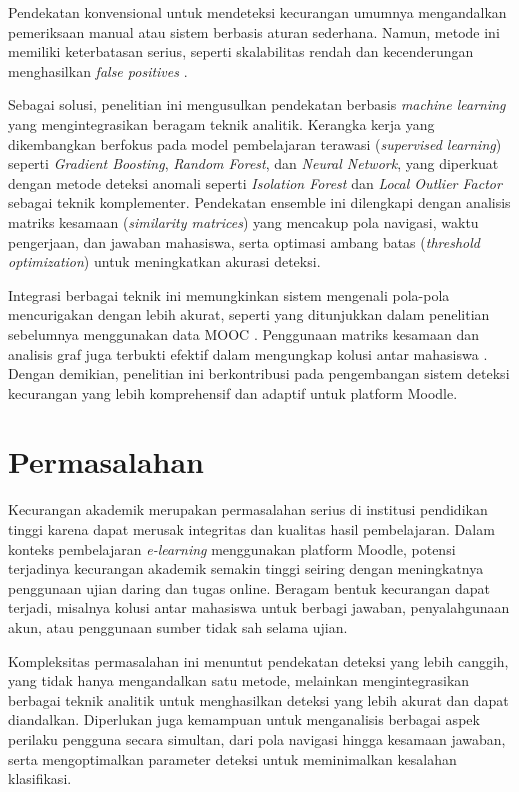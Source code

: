 Pendekatan konvensional untuk mendeteksi kecurangan umumnya mengandalkan pemeriksaan manual atau sistem berbasis aturan sederhana. Namun, metode ini memiliki keterbatasan serius, seperti skalabilitas rendah dan kecenderungan menghasilkan \textit{false positives} \cite{MorenoMarcos2023}. 

Sebagai solusi, penelitian ini mengusulkan pendekatan berbasis \textit{machine learning} yang mengintegrasikan beragam teknik analitik. Kerangka kerja yang dikembangkan berfokus pada model pembelajaran terawasi (\textit{supervised learning}) seperti \textit{Gradient Boosting}, \textit{Random Forest}, dan \textit{Neural Network}, yang diperkuat dengan metode deteksi anomali seperti \textit{Isolation Forest} dan \textit{Local Outlier Factor} sebagai teknik komplementer. Pendekatan ensemble ini dilengkapi dengan analisis matriks kesamaan (\textit{similarity matrices}) yang mencakup pola navigasi, waktu pengerjaan, dan jawaban mahasiswa, serta optimasi ambang batas (\textit{threshold optimization}) untuk meningkatkan akurasi deteksi.

Integrasi berbagai teknik ini memungkinkan sistem mengenali pola-pola mencurigakan dengan lebih akurat, seperti yang ditunjukkan dalam penelitian sebelumnya menggunakan data MOOC \cite{Alexandron2019}. Penggunaan matriks kesamaan dan analisis graf juga terbukti efektif dalam mengungkap kolusi antar mahasiswa \cite{Chang2023}. Dengan demikian, penelitian ini berkontribusi pada pengembangan sistem deteksi kecurangan yang lebih komprehensif dan adaptif untuk platform Moodle.

\section{Permasalahan}
\label{sec:masalah}

Kecurangan akademik merupakan permasalahan serius di institusi pendidikan tinggi karena dapat merusak integritas dan kualitas hasil pembelajaran. Dalam konteks pembelajaran \textit{e-learning} menggunakan platform Moodle, potensi terjadinya kecurangan akademik semakin tinggi seiring dengan meningkatnya penggunaan ujian daring dan tugas online. Beragam bentuk kecurangan dapat terjadi, misalnya kolusi antar mahasiswa untuk berbagi jawaban, penyalahgunaan akun, atau penggunaan sumber tidak sah selama ujian.

Kompleksitas permasalahan ini menuntut pendekatan deteksi yang lebih canggih, yang tidak hanya mengandalkan satu metode, melainkan mengintegrasikan berbagai teknik analitik untuk menghasilkan deteksi yang lebih akurat dan dapat diandalkan. Diperlukan juga kemampuan untuk menganalisis berbagai aspek perilaku pengguna secara simultan, dari pola navigasi hingga kesamaan jawaban, serta mengoptimalkan parameter deteksi untuk meminimalkan kesalahan klasifikasi.

